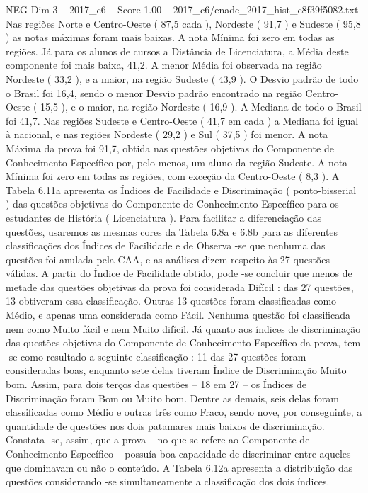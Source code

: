 \begin{textsample}{NEG Dim 3 – 2017\_c6 – Score 1.00 – 2017\_c6/enade\_2017\_hist\_c8f39f5082.txt}
Nas regiões Norte e Centro-Oeste ( 87,5 cada ), Nordeste ( 91,7 ) e Sudeste ( 95,8 ) as notas máximas foram mais baixas.
A nota Mínima foi zero em todas as regiões.
Já para os alunos de cursos a Distância de Licenciatura, a Média deste componente foi mais baixa, 41,2.
A menor Média foi observada na região Nordeste ( 33,2 ), e a maior, na região Sudeste ( 43,9 ).
O Desvio padrão de todo o Brasil foi 16,4, sendo o menor Desvio padrão encontrado na região Centro-Oeste ( 15,5 ), e o maior, na região Nordeste ( 16,9 ).
A Mediana de todo o Brasil foi 41,7.
Nas regiões Sudeste e Centro-Oeste ( 41,7 em cada ) a Mediana foi igual à nacional, e nas regiões Nordeste ( 29,2 ) e Sul ( 37,5 ) foi menor.
A nota Máxima da prova foi 91,7, obtida nas questões objetivas do Componente de Conhecimento Específico por, pelo menos, um aluno da região Sudeste.
A nota Mínima foi zero em todas as regiões, com exceção da Centro-Oeste ( 8,3 ).
A Tabela 6.11a apresenta os Índices de Facilidade e Discriminação ( ponto-bisserial ) das questões objetivas do Componente de Conhecimento Específico para os estudantes de História ( Licenciatura ).
Para facilitar a diferenciação das questões, usaremos as mesmas cores da Tabela 6.8a e 6.8b para as diferentes classificações dos Índices de Facilidade e de Observa -se que nenhuma das questões foi anulada pela CAA, e as análises dizem respeito às 27 questões válidas.
A partir do Índice de Facilidade obtido, pode -se concluir que menos de metade das questões objetivas da prova foi considerada Difícil : das 27 questões, 13 obtiveram essa classificação.
Outras 13 questões foram classificadas como Médio, e apenas uma considerada como Fácil.
Nenhuma questão foi classificada nem como Muito fácil e nem Muito difícil.
Já quanto aos índices de discriminação das questões objetivas do Componente de Conhecimento Específico da prova, tem -se como resultado a seguinte classificação : 11 das 27 questões foram consideradas boas, enquanto sete delas tiveram Índice de Discriminação Muito bom.
Assim, para dois terços das questões – 18 em 27 – os Índices de Discriminação foram Bom ou Muito bom.
Dentre as demais, seis delas foram classificadas como Médio e outras três como Fraco, sendo nove, por conseguinte, a quantidade de questões nos dois patamares mais baixos de discriminação.
Constata -se, assim, que a prova – no que se refere ao Componente de Conhecimento Específico – possuía boa capacidade de discriminar entre aqueles que dominavam ou não o conteúdo.
A Tabela 6.12a apresenta a distribuição das questões considerando -se simultaneamente a classificação dos dois índices.

\end{textsample}
